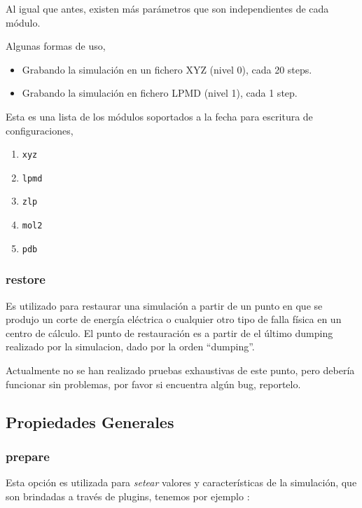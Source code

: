 Al igual que antes, existen m\'as par\'ametros que son independientes de cada m\'odulo.

Algunas formas de uso,

\begin{itemize}
 \item Grabando la simulaci\'on en un fichero XYZ (nivel 0), cada 20 steps.
 \item Grabando la simulaci\'on en fichero LPMD (nivel 1), cada 1 step.
\end{itemize}

Esta es una lista de los m\'odulos soportados a la fecha para escritura de configuraciones,

\begin{enumerate}
 \item \verb|xyz|
 \item \verb|lpmd|
 \item \verb|zlp|
 \item \verb|mol2|
 \item \verb|pdb|
\end{enumerate}


\subsubsection{restore}

Es utilizado para restaurar una simulaci\'on a partir de un punto en que se produjo un corte de energ\'ia el\'ectrica o cualquier otro tipo de falla f\'isica en un centro de c\'alculo. El punto de restauraci\'on es a partir de el \'ultimo dumping realizado por la simulacion, dado por la orden ``dumping''.

Actualmente no se han realizado pruebas exhaustivas de este punto, pero deber\'ia funcionar sin problemas, por favor si encuentra alg\'un bug, reportelo.

\subsection{Propiedades Generales}
\subsubsection{prepare}
Esta opci\'on es utilizada para \textit{setear} valores y caracter\'isticas de la simulaci\'on, que son brindadas a trav\'es de plugins, tenemos por ejemplo :

